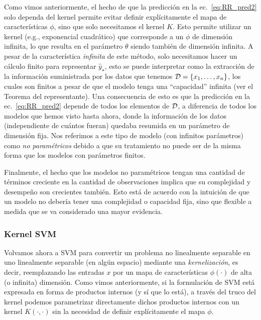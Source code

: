 \begin{remark} Como vimos anteriormente, el hecho de que la predicción en la ec.~\eqref{eq:RR_pred2} solo dependa del kernel permite evitar definir explícitamente el mapa de características $\phi$, sino que solo necesitamos el kernel $K$. Esto permite utilizar un kernel (e.g., exponencial cuadrático) que corresponde a un $\phi$ de dimensión infinita, lo que resulta en el parámetro $\theta$ siendo también de dimensión infinita. A pesar de la característica \emph{infinita} de este método, solo necesitamos hacer un cálculo finito para representar $\hat{y}_\star$, esto se puede interpretar como la extracción de la información suministrada por los datos que tenemos ${\mathcal D} = \{x_1,\ldots,x_n\}$, los cuales son finitos a pesar de que el modelo tenga una ``capacidad'' infinita (ver el Teorema del representante). Una consecuencia de esto es que la predicción en la ec.~\eqref{eq:RR_pred2} depende de todos los elementos de ${\mathcal D}$, a diferencia de todos los modelos que hemos visto hasta ahora, donde la información de los datos (independiente de cuántos fueran) quedaba resumida en un parámetro de dimensión fija. Nos referimos a este tipo de modelo (con infinitos parámetros) como \emph{no paramétricos} debido a que su tratamiento no puede ser de la misma forma que los modelos con parámetros finitos.  
\end{remark}

\begin{remark} 
Finalmente, el hecho que los modelos no paramétricos tengan una cantidad de términos creciente en la cantidad de observaciones implica que su complejidad y desempeño son crecientes también. Esto está de acuerdo con la intuición de que  un modelo no debería tener una complejidad o capacidad fija, sino que flexible a medida que se va considerado una mayor evidencia.
\end{remark}

\subsubsection{Kernel SVM}

Volvamos ahora a SVM para convertir un problema no linealmente separable en uno linealmente separable (en algún espacio) mediante una \emph{kernelización}, es decir, reemplazando las entradas $x$ por un mapa de características $\phi(\cdot)$ de alta (o infinita) dimensión. Como vimos anteriormente, si la formulación de SVM está expresada en forma de productos internos (y sí que lo está), a través del truco del kernel podemos parametrizar directamente dichos productos internos con un kernel $K(\cdot,\cdot)$ sin la necesidad de definir explícitamente el mapa $\phi$. 

